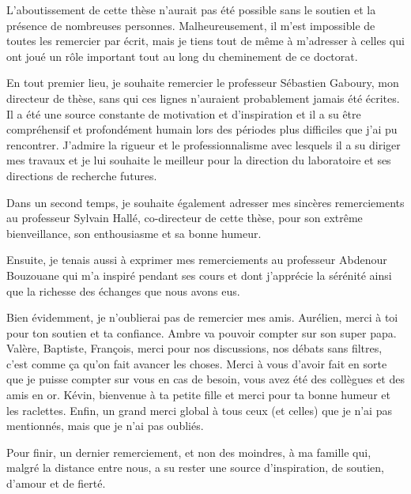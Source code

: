 \begin{ack}

L'aboutissement de cette thèse  n'aurait pas été possible sans le soutien et la présence de nombreuses personnes. Malheureusement, il m'est impossible de toutes les remercier par écrit, mais je tiens tout de même à m'adresser à celles qui ont joué un rôle important tout au long du cheminement de ce doctorat.

En tout premier lieu, je souhaite remercier le professeur Sébastien Gaboury, mon directeur de thèse, sans qui ces lignes n'auraient probablement jamais été écrites. Il a été une source constante de motivation et d’inspiration et il a su être compréhensif et profondément humain lors des périodes plus difficiles que j'ai pu rencontrer. J'admire la rigueur et le professionnalisme avec lesquels il a su diriger mes travaux et je lui souhaite le meilleur pour la direction du laboratoire et ses directions de recherche futures.

Dans un second temps, je souhaite également adresser mes sincères remerciements au professeur Sylvain Hallé, co-directeur de cette thèse, pour son extrême bienveillance, son enthousiasme et sa bonne humeur.

Ensuite, je tenais aussi à exprimer mes remerciements au professeur Abdenour Bouzouane qui m'a inspiré pendant ses cours et dont j'apprécie la sérénité ainsi que la richesse des échanges que nous avons eus.

Bien évidemment, je n'oublierai pas de remercier mes amis. Aurélien, merci à toi pour ton soutien et ta confiance. Ambre va pouvoir compter sur son super papa. Valère, Baptiste, François, merci pour nos discussions, nos débats sans filtres, c'est comme ça qu'on fait avancer les choses. Merci à vous d'avoir fait en sorte que je puisse compter sur vous en cas de besoin, vous avez été des collègues et des amis en or. Kévin, bienvenue à ta petite fille et merci pour ta bonne humeur et les raclettes. Enfin, un grand merci global à tous ceux (et celles) que je n'ai pas mentionnés, mais que je n'ai pas oubliés.

Pour finir, un dernier remerciement, et non des moindres, à ma famille qui, malgré la distance entre nous, a su rester une source d’inspiration, de soutien, d’amour et de fierté.

\end{ack}
